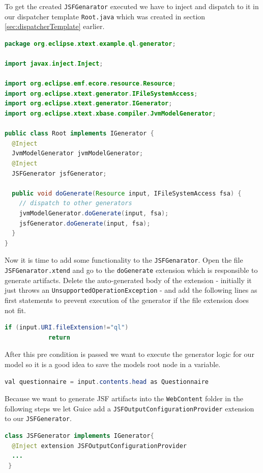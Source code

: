 To get the created \texttt{JSFGenarator} executed we have to inject and dispatch
to it in our dispatcher template \texttt{Root.java} which was created in section
\ref{sec:dispatcherTemplate} earlier.

\begin{lstlisting}[language=Java] 
 package org.eclipse.xtext.example.ql.generator;

import javax.inject.Inject;

import org.eclipse.emf.ecore.resource.Resource;
import org.eclipse.xtext.generator.IFileSystemAccess;
import org.eclipse.xtext.generator.IGenerator;
import org.eclipse.xtext.xbase.compiler.JvmModelGenerator;

public class Root implements IGenerator {
  @Inject
  JvmModelGenerator jvmModelGenerator;
  @Inject
  JSFGenerator jsfGenerator;

  public void doGenerate(Resource input, IFileSystemAccess fsa) {
    // dispatch to other generators
    jvmModelGenerator.doGenerate(input, fsa);
    jsfGenerator.doGenerate(input, fsa);
  } 
}
\end{lstlisting}

Now it is time to add some functionality to the \texttt{JSFGenarator}. Open the
file \texttt{JSFGenarator.xtend} and go to the \texttt{doGenerate} extension
which is responsible to generate artifacts. Delete the auto-generated body of
the extension - initially it just throws an
\texttt{UnsupportedOperationException} - and add the following lines as first
statements to prevent execution of the generator if the file extension does not fit.

\begin{lstlisting}[language=Java] 
  if (input.URI.fileExtension!="ql")
            return
\end{lstlisting}

After this pre condition is passed we want to execute the generator logic for
our model so it is a good idea to save the models root node in a variable.

\begin{lstlisting}[language=Java] 
  val questionnaire = input.contents.head as Questionnaire 
\end{lstlisting}

Because we want to generate JSF artifacts into the \texttt{WebContent} folder
in the following steps we let Guice add a \texttt{JSFOutputConfigurationProvider}
extension to our \texttt{JSFGenerator}.

\begin{lstlisting}[language=Java] 
class JSFGenerator implements IGenerator{
  @Inject extension JSFOutputConfigurationProvider
  ...
 }
\end{lstlisting}

